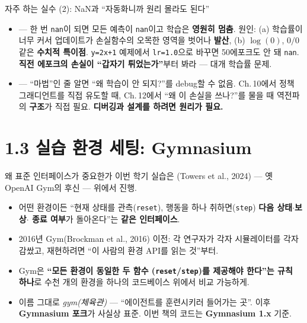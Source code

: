 \documentclass[aspectratio=169,11pt]{beamer}
\begin{document}
\begin{frame}{자주 하는 실수 (2): NaN과 ``자동화니까 원리 몰라도 된다''}
  \begin{itemize}
    \item {} --- 한 번 \texttt{nan}이
      되면 모든 예측이 \texttt{nan}이고 학습은 \textbf{영원히 멈춤}.
      원인: (a) 학습률이 너무 커서 업데이트가 손실함수의 오목한 영역을
      벗어나 \textbf{발산}, (b) $\log(0)$, $0/0$ 같은 \textbf{수치적
      특이점}. \texttt{y=2x{+}1} 예제에서 \texttt{lr=1.0}으로 바꾸면
      50에포크도 안 돼 \texttt{nan}.
      \textbf{직전 에포크의 손실이 ``갑자기 튀었는가''}부터 봐라 ---
      대개 학습률 문제.
    \item {} ---
      ``마법''인 줄 알면 ``왜 학습이 안 되지?''를 debug할 수 없음.
      Ch.\,10에서 정책 그래디언트를 직접 유도할 때, Ch.\,12에서
      ``왜 이 손실을 쓰나?''를 물을 때 역전파의 \textbf{구조}가
      직접 필요.
      \textbf{디버깅과 설계를 하려면 원리가 필요.}
  \end{itemize}
\end{frame}

\section{1.3 실습 환경 세팅: Gymnasium}

\begin{frame}{왜 표준 인터페이스가 중요한가}
  이번 학기 실습은 (Towers et al., 2024) ---
  옛 OpenAI Gym의 후신 --- 위에서 진행.
  \begin{itemize}
    \item 어떤 환경이든 ``현재 상태를 관측(\texttt{reset}),
      행동을 하나 취하면(\texttt{step}) \textbf{다음 상태$\cdot$보상$\cdot$
      종료 여부}가 돌아온다''는 \textbf{같은 인터페이스}.
    \item 2016년 Gym(Brockman et al., 2016) 이전: 각 연구자가 각자
      시뮬레이터를 각자 감쌌고, 재현하려면 ``이 사람의 환경 API를
      읽는 것''부터.
    \item Gym은 \textbf{``모든 환경이 동일한 두 함수
      (\texttt{reset}/\texttt{step})를 제공해야 한다''는 규칙 하나}로
      수천 개의 환경을 하나의 코드베이스 위에서 비교 가능하게.
    \item 이름 그대로 \textit{gym(체육관)} --- ``에이전트를 훈련시키러
      들어가는 곳''. 이후 \textbf{Gymnasium 포크}가 사실상 표준.
      이번 책의 코드는 \textbf{Gymnasium 1.x} 기준.
  \end{itemize}
\end{frame}
\end{document}
